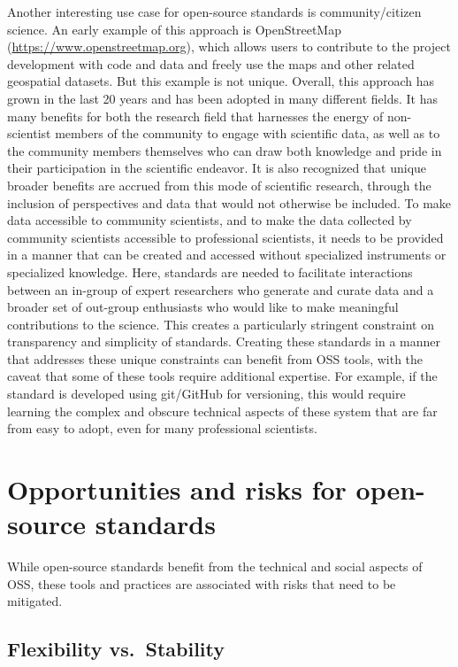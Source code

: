 \documentclass[
  number]{elsarticle}
\begin{document}
Another interesting use case for open-source standards is
community/citizen science. An early example of this approach is
OpenStreetMap (\url{https://www.openstreetmap.org}), which allows users
to contribute to the project development with code and data and freely
use the maps and other related geospatial datasets. But this example is
not unique. Overall, this approach has grown in the last 20 years and
has been adopted in many different fields. It has many benefits for both
the research field that harnesses the energy of non-scientist members of
the community to engage with scientific data, as well as to the
community members themselves who can draw both knowledge and pride in
their participation in the scientific endeavor. It is also recognized
that unique broader benefits are accrued from this mode of scientific
research, through the inclusion of perspectives and data that would not
otherwise be included. To make data accessible to community scientists,
and to make the data collected by community scientists accessible to
professional scientists, it needs to be provided in a manner that can be
created and accessed without specialized instruments or specialized
knowledge. Here, standards are needed to facilitate interactions between
an in-group of expert researchers who generate and curate data and a
broader set of out-group enthusiasts who would like to make meaningful
contributions to the science. This creates a particularly stringent
constraint on transparency and simplicity of standards. Creating these
standards in a manner that addresses these unique constraints can
benefit from OSS tools, with the caveat that some of these tools require
additional expertise. For example, if the standard is developed using
git/GitHub for versioning, this would require learning the complex and
obscure technical aspects of these system that are far from easy to
adopt, even for many professional scientists.

\section{Opportunities and risks for open-source
standards}\label{sec-challenges}

While open-source standards benefit from the technical and social
aspects of OSS, these tools and practices are associated with risks that
need to be mitigated.

\subsection{Flexibility vs.~Stability}\label{flexibility-vs.-stability}
\end{document}
